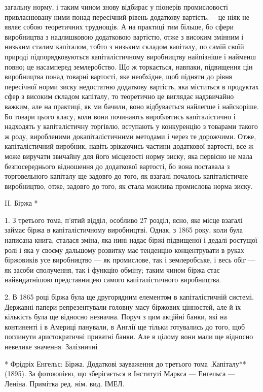 \parcont{}  %
загальну норму, і таким чином знову відбирає у піонерів промисловості привласнювану ними понад пересічний рівень додаткову
вартість,— це ніяк не являє собою теоретичних труднощів. А на практиці тим більше, бо сфери виробництва з надлишковою
додатковою вартістю, отже з високим змінним і низьким сталим капіталом, тобто з низьким складом капіталу, по самій своїй
природі підпорядковуються капіталістичному виробництву найпізніше і найменш повно; це насамперед землеробство. Що ж
торкається, навпаки, підвищення цін виробництва понад товарні вартості, яке необхідне, щоб підняти до рівня пересічної норми
зиску недостатню додаткову вартість, яка міститься в продуктах сфер з високим складом капіталу, то теоретично це виглядає
надзвичайно важким, але на практиці, як ми бачили, воно відбувається найлегше і найскоріше. Бо товари цього класу, коли вони
починають вироблятись капіталістично і надходять у капіталістичну торгівлю, вступають у конкуренцію з товарами такого ж
роду, виробленими докапіталістичними методами і через те дорожчими. Отже, капіталістичний виробник, навіть зрікаючись
частини додаткової вартості, все ж може виручати звичайну для його місцевості норму зиску, яка первісно не мала
безпосереднього відношення до додаткової вартості, бо вона поставала з торговельного капіталу ще задовго до того, як взагалі
почалось капіталістичне виробництво, отже, задовго до того, як стала можлива промислова норма зиску.

II. Біржа *

1. З третього тома, п’ятий відділ, особливо 27 розділ, ясно, яке місце взагалі займає біржа в капіталістичному виробництві. Однак, з 1865 року, коли була написана книга, сталася зміна, яка нині надає біржі підвищеної і дедалі ростущої ролі і яка у
своєму дальшому розвитку має тенденцію концентрувати в руках біржовиків усе виробництво — як промислове, так і землеробське,
і весь обіг — як засоби сполучення, так і функцію обміну; таким чином біржа стає найвидатнішою представницею самого
капіталістичного виробництва.

2. В 1865 році біржа була ще другорядним елементом в капіталістичній системі. Державні папери
репрезентували головну масу біржових цінностей, але й їх кількість була ще відносно незначна. Поруч з цим акційні банки, які
на континенті і в Америці панували, в Англії ще тільки готувались до того, щоб поглинути аристократичні приватні банки. Але
в цілому вони мали ще відносно невелике значення. Залізничні

* Фрідріх Енгельс: Біржа. Додаткові зауваження до третього тома .Капіталу** (1895). За фотокопією, що зберігається в
Інституті Маркса — Енгельса — Леніна. Примітка ред. нім. вид. ІМЕЛ.
\parbreak{}  %
